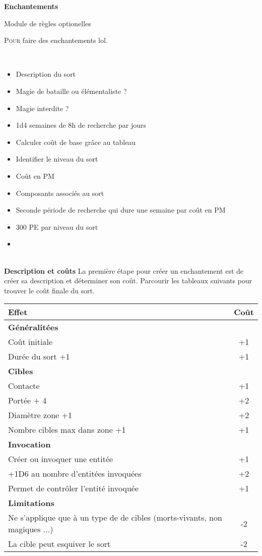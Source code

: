 \documentclass[11pt]{article} %
\newcommand{\enluminure}[2]{\lettrine[lines=3]{\small \initfamily #1}{#2}}
\newcommand{\myjump}[1][1]{\mbox{}\\[#1cm]}
\begin{document}
\pagestyle{empty}

\begin{center}
    \textbf{Enchantements}

    Module de règles optionelles
\end{center}

\enluminure{P}{our} faire des enchantements lol.

\myjump
\begin{itemize}
    \item Description du sort
    \item Magie de bataille ou élémentaliste ?
    \item Magie interdite ?
    \item 1d4 semaines de 8h de recherche par jours
    \item Calculer coût de base grâce au tableau
    \item Identifier le niveau du sort
    \item Coût en PM
    \item Composants associés au sort
    \item Seconde période de recherche qui dure une semaine par coût en PM
    \item 300 PE par niveau du sort
    \item


\end{itemize}


\myjump[0]
\textbf{\huge Description et coûts}\newline
La première étape pour créer un enchantement est de créer sa description et déterminer son coût. Parcourir les tableaux suivants pour trouver le coût finale du sort.\newline


\noindent
\begin{tabularx}{\linewidth}{|Xc|}
\hline

    \textbf{Effet} & \textbf{Coût}\\
    \hline
    \textbf{Généralitées} &\\
    Coût initiale & +1\\
    Durée du sort +1 & +1\\
    \hline
    \textbf{Cibles} &\\
    Contacte & +1\\
    Portée + 4 & +2\\
    Diamètre zone +1 & +2\\
    Nombre cibles max dans zone +1 & +1\\
    \hline
    \textbf{Invocation} &\\
    Créer ou invoquer une entitée & +1\\
    +1D6 au nombre d'entitées invoquées & +2\\
    Permet de contrôler l'entité invoquée & +1\\
    \hline
    \textbf{Limitations} &\\
    Ne s'applique que à un type de de cibles (morts-vivants, non magiques ...) & -2\\
    La cible peut esquiver le sort & -2\\


\hline
\end{tabularx}
\end{document}
